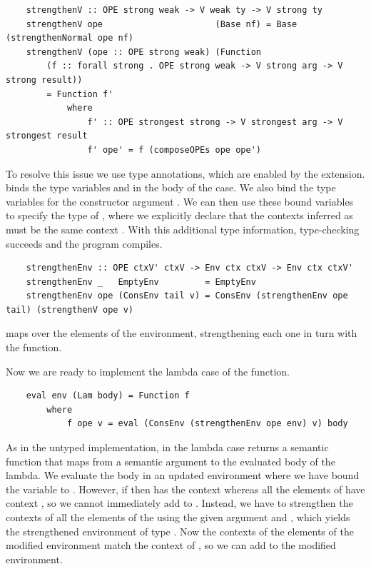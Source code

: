 \begin{lstlisting}
    strengthenV :: OPE strong weak -> V weak ty -> V strong ty
    strengthenV ope                      (Base nf) = Base (strengthenNormal ope nf)
    strengthenV (ope :: OPE strong weak) (Function 
        (f :: forall strong . OPE strong weak -> V strong arg -> V strong result)) 
        = Function f' 
            where
                f' :: OPE strongest strong -> V strongest arg -> V strongest result
                f' ope' = f (composeOPEs ope ope')
\end{lstlisting}

To resolve this issue we use type annotations, which are enabled by the  extension.  binds the type variables  and  in the body of the case. We also bind the type variables for the constructor argument . We can then use these bound variables to specify the type of , where we explicitly declare that the contexts inferred as  must be the same context . With this additional type information, type-checking succeeds and the program compiles.

\begin{lstlisting}
    strengthenEnv :: OPE ctxV' ctxV -> Env ctx ctxV -> Env ctx ctxV'
    strengthenEnv _   EmptyEnv         = EmptyEnv
    strengthenEnv ope (ConsEnv tail v) = ConsEnv (strengthenEnv ope tail) (strengthenV ope v)
\end{lstlisting}

 maps over the elements of the environment, strengthening each one in turn with the  function.

Now we are ready to implement the lambda case of the  function.

\begin{lstlisting}
    eval env (Lam body) = Function f 
        where
            f ope v = eval (ConsEnv (strengthenEnv ope env) v) body
\end{lstlisting}

As in the untyped implementation, in the lambda case  returns a semantic function that maps from a semantic argument  to the evaluated body of the lambda. We evaluate the body in an updated environment where we have bound the variable  to . However, if  then  has the context  whereas all the elements of  have context , so we cannot immediately add  to . Instead, we have to strengthen the contexts of all the elements of the  using the given  argument and , which yields the strengthened environment of type . Now the contexts of the elements of the modified environment match the context  of , so we can add  to the modified environment. 

